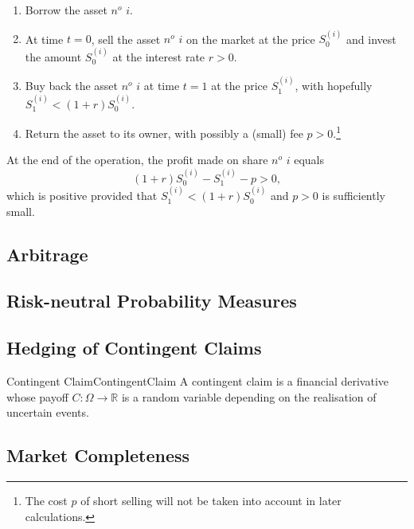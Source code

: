 \begin{enumerate}
    \item Borrow the asset $n^o$ $i$.

    \item At time $t=0$, sell the asset $n^o$ $i$ on the market at the price $S_0^{(i)}$ and invest the amount $S_0^{(i)}$ at the interest rate $r > 0$.

    \item Buy back the asset $n^o$ $i$ at time $t=1$ at the price $S_1^{(i)}$, with hopefully $S_1^{(i)} < (1+r)S_0^{(i)}$.

    \item Return the asset to its owner, with possibly a (small) fee $p > 0$.\footnote{The cost $p$ of short selling will not be taken into account in later calculations.}
\end{enumerate}

\noindent At the end of the operation, the profit made on share $n^o$ $i$ equals
\begin{equation} \label{eq:ShortSellingProfit}
    (1+r)S_0^{(i)} - S_1^{(i)} - p > 0,
\end{equation}
which is positive provided that $S_1^{(i)} < (1+r)S_0^{(i)}$ and $p > 0$ is sufficiently small.

\subsection{Arbitrage}


\subsection{Risk-neutral Probability Measures}


\subsection{Hedging of Contingent Claims}
\begin{defn}{Contingent Claim}{ContingentClaim}
A contingent claim is a financial derivative whose payoff $C : \Omega \longrightarrow \mathbb{R}$ is a random variable depending on the realisation of uncertain events.
\end{defn}

\subsection{Market Completeness}